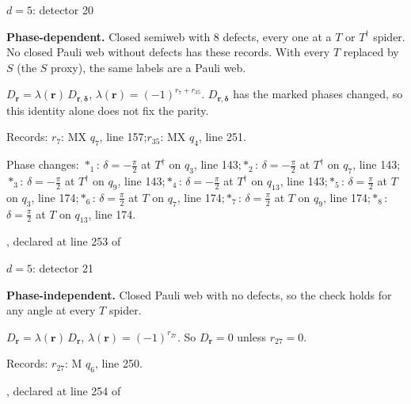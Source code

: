 \label{d5_det020}
{\Large $d=5$: detector 20}\par
\textbf{Phase-dependent.} Closed semiweb with 8 defects, every one at a $T$ or $T^\dagger$ spider. No closed Pauli web without defects has these records. With every $T$ replaced by $S$ (the $S$ proxy), the same labels are a Pauli web.
\begin{center}
\end{center}
\vspace{-1mm}
$D_{\boldsymbol r}=\lambda(\boldsymbol r)\,D_{\boldsymbol r,\boldsymbol\delta}$, \quad $\lambda(\boldsymbol r)=(-1)^{r_{7}+r_{35}}$. \qquad $D_{\boldsymbol r,\boldsymbol\delta}$ has the marked phases changed, so this identity alone does not fix the parity.
\par\smallskip\begin{minipage}{.98\linewidth}\small Records: $r_{7}$: MX $q_{7}$, line 157;\quad $r_{35}$: MX $q_{4}$, line 251.\end{minipage}
\par\smallskip\begin{minipage}{.98\linewidth}\small Phase changes: $\ast_{1}$: $\delta=-\frac{\pi}{2}$ at $T^\dagger$ on $q_{3}$, line 143;\quad $\ast_{2}$: $\delta=-\frac{\pi}{2}$ at $T^\dagger$ on $q_{7}$, line 143;\quad $\ast_{3}$: $\delta=-\frac{\pi}{2}$ at $T^\dagger$ on $q_{9}$, line 143;\quad $\ast_{4}$: $\delta=-\frac{\pi}{2}$ at $T^\dagger$ on $q_{13}$, line 143;\quad $\ast_{5}$: $\delta=\frac{\pi}{2}$ at $T$ on $q_{3}$, line 174;\quad $\ast_{6}$: $\delta=\frac{\pi}{2}$ at $T$ on $q_{7}$, line 174;\quad $\ast_{7}$: $\delta=\frac{\pi}{2}$ at $T$ on $q_{9}$, line 174;\quad $\ast_{8}$: $\delta=\frac{\pi}{2}$ at $T$ on $q_{13}$, line 174.\end{minipage}
\vfill
{\footnotesize\texttt{}, declared at line 253 of \texttt{}}
\newpage

\label{d5_det021}
{\Large $d=5$: detector 21}\par
\textbf{Phase-independent.} Closed Pauli web with no defects, so the check holds for any angle at every $T$ spider.
\begin{center}
\end{center}
\vspace{-1mm}
$D_{\boldsymbol r}=\lambda(\boldsymbol r)\,D_{\boldsymbol r}$, \quad $\lambda(\boldsymbol r)=(-1)^{r_{27}}$. \qquad So $D_{\boldsymbol r}=0$ unless $r_{27}=0$.
\par\smallskip\begin{minipage}{.98\linewidth}\small Records: $r_{27}$: M $q_{6}$, line 250.\end{minipage}
\vfill
{\footnotesize\texttt{}, declared at line 254 of \texttt{}}
\newpage

